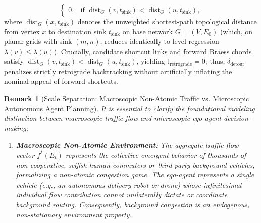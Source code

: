 \documentclass[11pt,a4paper]{article}
\newtheorem{remark}{Remark}
\begin{document}
\begin{itemize}
\begin{equation}
\begin{cases}
    0, & \text{if } \operatorname{dist}_G(v, t_{\text{sink}}) < \operatorname{dist}_G(u, t_{\text{sink}}),
    \end{cases}
    \end{equation}
    where $\operatorname{dist}_G(x, t_{\text{sink}})$ denotes the unweighted shortest-path topological distance from vertex $x$ to destination sink $t_{\text{sink}}$ on base network $G = (V, E_0)$ (which, on planar grids with sink $(m, n)$, reduces identically to level regression $\lambda(v) \le \lambda(u)$). Crucially, candidate shortcut links and forward Braess chords satisfy $\operatorname{dist}_G(v, t_{\text{sink}}) < \operatorname{dist}_G(u, t_{\text{sink}})$, yielding $\mathbb{I}_{\text{retrograde}} = 0$; thus, $\delta_{\text{detour}}$ penalizes strictly retrograde backtracking without artificially inflating the nominal appeal of forward shortcuts.
\end{itemize}

\begin{remark}[Scale Separation: Macroscopic Non-Atomic Traffic vs. Microscopic Autonomous Agent Planning]
\label{rem:scale_separation}
It is essential to clarify the foundational modeling distinction between macroscopic traffic flow and microscopic ego-agent decision-making:
\begin{enumerate}
    \item \textbf{Macroscopic Non-Atomic Environment}: The aggregate traffic flow vector $f^*(E_t)$ represents the collective emergent behavior of thousands of non-cooperative, selfish human commuters or third-party background vehicles, formalizing a non-atomic congestion game. The ego-agent represents a single vehicle (e.g., an autonomous delivery robot or drone) whose infinitesimal individual flow contribution cannot unilaterally dictate or coordinate background routing. Consequently, background congestion is an \textit{endogenous, non-stationary environment property}.

\end{enumerate}
\end{remark}
\end{document}
